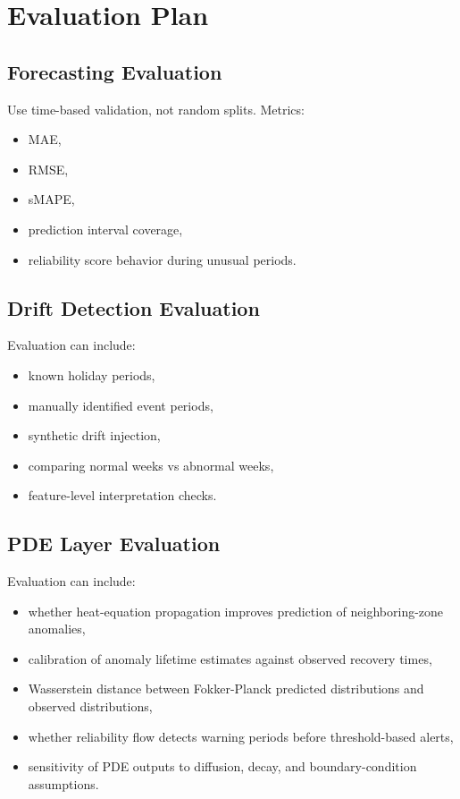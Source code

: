 \documentclass[11pt]{article}
\begin{document}
\section{Evaluation Plan}

\subsection{Forecasting Evaluation}

Use time-based validation, not random splits. Metrics:

\begin{itemize}
    \item MAE,
    \item RMSE,
    \item sMAPE,
    \item prediction interval coverage,
    \item reliability score behavior during unusual periods.
\end{itemize}

\subsection{Drift Detection Evaluation}

Evaluation can include:

\begin{itemize}
    \item known holiday periods,
    \item manually identified event periods,
    \item synthetic drift injection,
    \item comparing normal weeks vs abnormal weeks,
    \item feature-level interpretation checks.
\end{itemize}

\subsection{PDE Layer Evaluation}

Evaluation can include:

\begin{itemize}
    \item whether heat-equation propagation improves prediction of neighboring-zone anomalies,
    \item calibration of anomaly lifetime estimates against observed recovery times,
    \item Wasserstein distance between Fokker-Planck predicted distributions and observed distributions,
    \item whether reliability flow detects warning periods before threshold-based alerts,
    \item sensitivity of PDE outputs to diffusion, decay, and boundary-condition assumptions.
\end{itemize}
\end{document}

